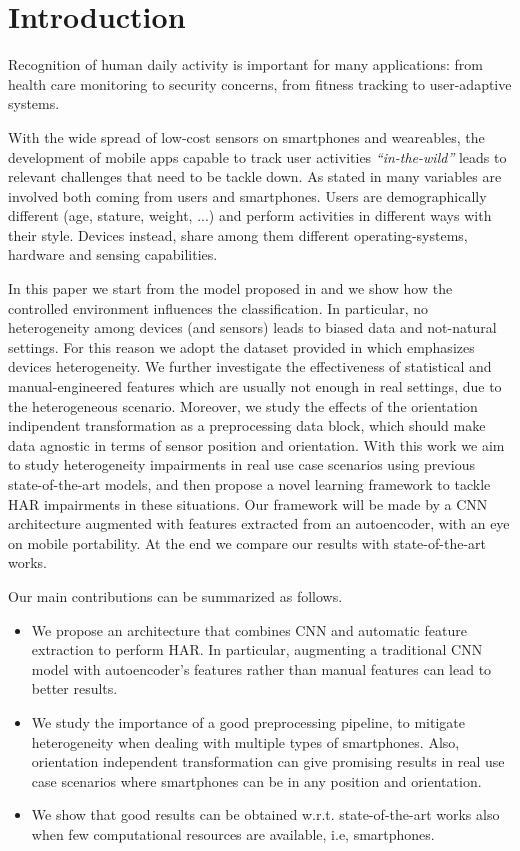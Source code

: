 
\section{Introduction}
\label{sec:introduction}

Recognition of human daily activity is important for many
applications: from health care monitoring to security concerns, from
fitness tracking to user-adaptive systems.

With the wide spread of low-cost sensors on smartphones and
weareables, the development of mobile apps capable to track user
activities \textit{``in-the-wild''} leads to relevant challenges that
need to be tackle down. As stated in \cite{blunck2013heterogeneity}
many variables are involved both coming from users and
smartphones. Users are demographically different (age, stature,
weight, ...) and perform activities in different ways with their
style. Devices instead, share among them different operating-systems,
hardware and sensing capabilities.

In this paper we start from the model proposed in
\cite{ignatov2018real} and we show how the controlled environment
influences the classification.  In particular, no heterogeneity among
devices (and sensors) leads to biased data and not-natural settings.
For this reason we adopt the dataset provided in
\cite{stisen2015smart} which emphasizes devices heterogeneity.  We
further investigate the effectiveness of statistical and
manual-engineered features which are usually not enough in real
settings, due to the heterogeneous scenario. Moreover, we study the
effects of the orientation indipendent transformation as a
preprocessing data block, which should make data agnostic in terms of
sensor position and orientation.  With this work we aim to study
heterogeneity impairments in real use case scenarios using previous
state-of-the-art models, and then propose a novel learning framework
to tackle HAR impairments in these situations. Our framework will be made by a CNN
architecture augmented with features extracted from an autoencoder,
with an eye on mobile portability.  At the end we compare our results
with state-of-the-art works.

Our main contributions can be summarized as follows.

\begin{itemize}
  \item We propose an architecture that combines CNN and automatic
    feature extraction to perform HAR. In particular, augmenting a
    traditional CNN model with autoencoder's features rather than
    manual features can lead to better results.
  \item We study the importance of a good preprocessing pipeline, to
    mitigate heterogeneity when dealing with multiple types of
    smartphones. Also, orientation independent transformation can give
    promising results in real use case scenarios where smartphones can
    be in any position and orientation.
  \item We show that good results can be obtained
    w.r.t. state-of-the-art works also when few computational
    resources are available, i.e, smartphones.
\end{itemize}

